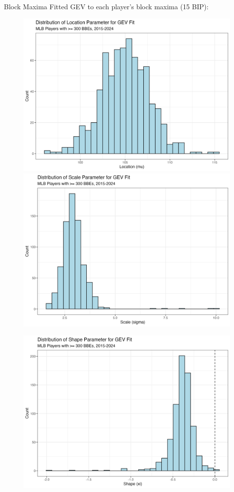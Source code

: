 \documentclass{beamer}
\begin{document}
\begin{frame}[allowframebreaks]{Block Maxima}
    Fitted GEV to each player's block maxima (15 BIP):
    \begin{figure}
        \includegraphics[width=0.49\linewidth]{plots/location.png}
        \hfill
        \includegraphics[width=0.49\linewidth]{plots/scale.png}
    \end{figure}
    \begin{figure}
        \centering
        \includegraphics[width=0.85\linewidth]{plots/shape.png}
    \end{figure}
\end{frame}
\end{document}
